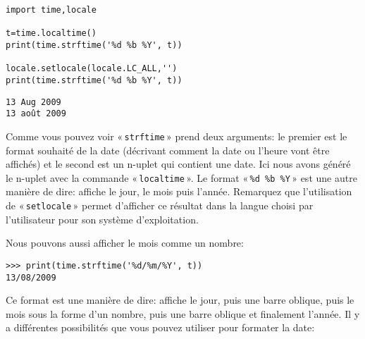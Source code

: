 \begin{Verbatim}[frame=single,rulecolor=\color{gray},label=code]
import time,locale

t=time.localtime()
print(time.strftime('%d %b %Y', t))

locale.setlocale(locale.LC_ALL,'')
print(time.strftime('%d %b %Y', t))
\end{Verbatim}


\begin{Verbatim}[frame=single,rulecolor=\color{gray},label=résultat]
13 Aug 2009
13 août 2009
\end{Verbatim}

Comme vous pouvez voir « \texttt{strftime} » prend deux arguments: le premier est le format souhaité de la date (décrivant comment la date ou l'heure vont être affichés) et le second est un n-uplet qui contient une date. Ici nous avons généré le n-uplet avec la commande « \texttt{localtime} ». Le format « \texttt{\%d \%b \%Y} » est une autre manière de dire: affiche le jour, le mois puis l'année. Remarquez que l'utilisation de « \texttt{setlocale} » permet d'afficher ce résultat dans la langue choisi par l'utilisateur pour son système d'exploitation.

Nous pouvons aussi afficher le mois comme un nombre:
\begin{Verbatim}[frame=single,rulecolor=\color{gray}]
>>> print(time.strftime('%d/%m/%Y', t))
13/08/2009
\end{Verbatim}

Ce format est une manière de dire: affiche le jour, puis une barre oblique, puis le mois sous la forme d'un nombre, puis une barre oblique et finalement l'année.
Il y a différentes possibilités que vous pouvez utiliser pour formater la date:

